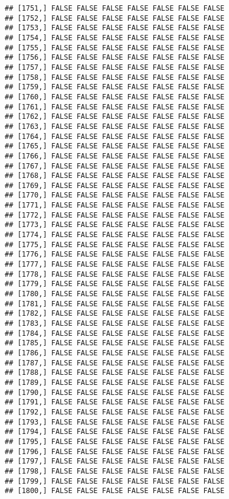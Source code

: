 \documentclass[
]{article}
\begin{document}
\begin{verbatim}
## [1751,] FALSE FALSE FALSE FALSE FALSE FALSE FALSE
## [1752,] FALSE FALSE FALSE FALSE FALSE FALSE FALSE
## [1753,] FALSE FALSE FALSE FALSE FALSE FALSE FALSE
## [1754,] FALSE FALSE FALSE FALSE FALSE FALSE FALSE
## [1755,] FALSE FALSE FALSE FALSE FALSE FALSE FALSE
## [1756,] FALSE FALSE FALSE FALSE FALSE FALSE FALSE
## [1757,] FALSE FALSE FALSE FALSE FALSE FALSE FALSE
## [1758,] FALSE FALSE FALSE FALSE FALSE FALSE FALSE
## [1759,] FALSE FALSE FALSE FALSE FALSE FALSE FALSE
## [1760,] FALSE FALSE FALSE FALSE FALSE FALSE FALSE
## [1761,] FALSE FALSE FALSE FALSE FALSE FALSE FALSE
## [1762,] FALSE FALSE FALSE FALSE FALSE FALSE FALSE
## [1763,] FALSE FALSE FALSE FALSE FALSE FALSE FALSE
## [1764,] FALSE FALSE FALSE FALSE FALSE FALSE FALSE
## [1765,] FALSE FALSE FALSE FALSE FALSE FALSE FALSE
## [1766,] FALSE FALSE FALSE FALSE FALSE FALSE FALSE
## [1767,] FALSE FALSE FALSE FALSE FALSE FALSE FALSE
## [1768,] FALSE FALSE FALSE FALSE FALSE FALSE FALSE
## [1769,] FALSE FALSE FALSE FALSE FALSE FALSE FALSE
## [1770,] FALSE FALSE FALSE FALSE FALSE FALSE FALSE
## [1771,] FALSE FALSE FALSE FALSE FALSE FALSE FALSE
## [1772,] FALSE FALSE FALSE FALSE FALSE FALSE FALSE
## [1773,] FALSE FALSE FALSE FALSE FALSE FALSE FALSE
## [1774,] FALSE FALSE FALSE FALSE FALSE FALSE FALSE
## [1775,] FALSE FALSE FALSE FALSE FALSE FALSE FALSE
## [1776,] FALSE FALSE FALSE FALSE FALSE FALSE FALSE
## [1777,] FALSE FALSE FALSE FALSE FALSE FALSE FALSE
## [1778,] FALSE FALSE FALSE FALSE FALSE FALSE FALSE
## [1779,] FALSE FALSE FALSE FALSE FALSE FALSE FALSE
## [1780,] FALSE FALSE FALSE FALSE FALSE FALSE FALSE
## [1781,] FALSE FALSE FALSE FALSE FALSE FALSE FALSE
## [1782,] FALSE FALSE FALSE FALSE FALSE FALSE FALSE
## [1783,] FALSE FALSE FALSE FALSE FALSE FALSE FALSE
## [1784,] FALSE FALSE FALSE FALSE FALSE FALSE FALSE
## [1785,] FALSE FALSE FALSE FALSE FALSE FALSE FALSE
## [1786,] FALSE FALSE FALSE FALSE FALSE FALSE FALSE
## [1787,] FALSE FALSE FALSE FALSE FALSE FALSE FALSE
## [1788,] FALSE FALSE FALSE FALSE FALSE FALSE FALSE
## [1789,] FALSE FALSE FALSE FALSE FALSE FALSE FALSE
## [1790,] FALSE FALSE FALSE FALSE FALSE FALSE FALSE
## [1791,] FALSE FALSE FALSE FALSE FALSE FALSE FALSE
## [1792,] FALSE FALSE FALSE FALSE FALSE FALSE FALSE
## [1793,] FALSE FALSE FALSE FALSE FALSE FALSE FALSE
## [1794,] FALSE FALSE FALSE FALSE FALSE FALSE FALSE
## [1795,] FALSE FALSE FALSE FALSE FALSE FALSE FALSE
## [1796,] FALSE FALSE FALSE FALSE FALSE FALSE FALSE
## [1797,] FALSE FALSE FALSE FALSE FALSE FALSE FALSE
## [1798,] FALSE FALSE FALSE FALSE FALSE FALSE FALSE
## [1799,] FALSE FALSE FALSE FALSE FALSE FALSE FALSE
## [1800,] FALSE FALSE FALSE FALSE FALSE FALSE FALSE

\end{verbatim}
\end{document}
